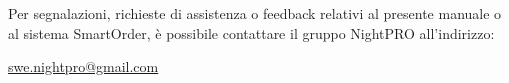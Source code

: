 Per segnalazioni, richieste di assistenza o feedback relativi al presente manuale o al sistema SmartOrder, \`e possibile contattare il gruppo NightPRO all'indirizzo:

\begin{center}
    \large \leavevmode\href{swe.nightpro@gmail.com}{swe.nightpro@gmail.com}
\end{center}
